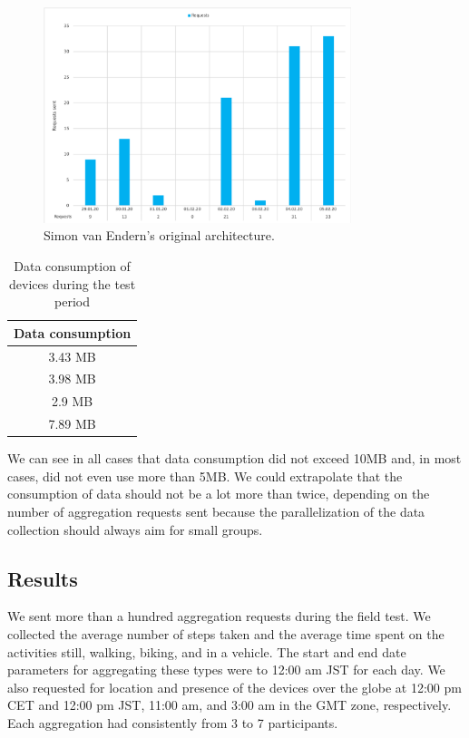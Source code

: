 \begin{figure}[htbp]
  \centering
  \includegraphics[width=0.8\textwidth]{figures/diagram_requests.png}
  \caption{Simon van Endern's original architecture.} \label{fig:diagram_requests}
\end{figure}

\begin{table}[htbp]
	\centering
	\begin{tabular}{|c|} 
		\hline
		\textbf{Data consumption}\\ [0.5ex] 
		\hline
		3.43 MB \\
		\hline
		3.98 MB \\
		\hline
		2.9 MB \\
		\hline
		7.89 MB \\
		\hline
	\end{tabular}
	\caption{Data consumption of devices during the test period }
	\label{tab:data}
\end{table}

We can see in all cases that data consumption did not exceed 10MB and, in most cases, did not even use more than 5MB. We could extrapolate that the consumption of data should not be a lot more than twice, depending on the number of aggregation requests sent because the parallelization of the data collection should always aim for small groups.

\subsection{Results}
We sent more than a hundred aggregation requests during the field test. We collected the average number of steps taken and the average time spent on the activities still, walking, biking, and in a vehicle. The start and end date parameters for aggregating these types were to 12:00 am JST for each day. We also requested for location and presence of the devices over the globe at 12:00 pm CET and 12:00 pm JST, 11:00 am, and 3:00 am in the GMT zone, respectively. Each aggregation had consistently from 3 to 7 participants.

